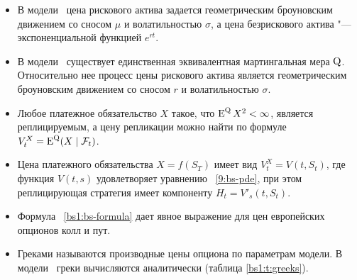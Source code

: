\summary
\begin{itemize}
\item В модели \bs\ цена рискового актива задается геометрическим броуновским движением со сносом $\mu$ и волатильностью $\sigma$, а цена безрискового актива "--- экспоненциальной функцией $e^{rt}$.

\item В модели \bs\ существует единственная эквивалентная мартингальная мера $\mathrm{Q}$.
Относительно нее процесс цены рискового актива является геометрическим броуновским движением со сносом $r$ и волатильностью $\sigma$.

\item Любое платежное обязательство $X$ такое, что $\operatorname{E}^{\mathrm{Q}} X^2<\infty$, является реплицируемым, а цену репликации можно найти по формуле $V_t^X = \operatorname{E}^{\mathrm{Q}} (X \mid \mathcal{F}_t)$.

\item Цена платежного обязательства $X=f(S_T)$ имеет вид $V_t^X = V(t,S_t)$, где функция $V(t,s)$ удовлетворяет уравнению \bs\ \eqref{9:bs-pde}, при этом реплицирующая стратегия имеет компоненту $H_t = V'_s(t,S_t)$.

\item Формула \bs\ \eqref{bs1:bs-formula} дает явное выражение для цен европейских опционов колл и пут.

\item Греками называются производные цены опциона по параметрам модели. В модели \bs\ греки вычисляются аналитически (таблица \ref{bs1:t:greeks}).
\end{itemize}
